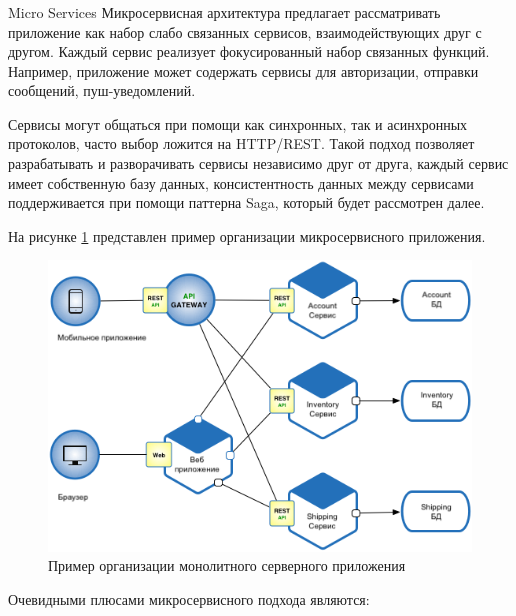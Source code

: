 \subsubsection {} Micro Services
Микросервисная архитектура предлагает рассматривать приложение как набор слабо связанных сервисов, взаимодействующих друг с другом. Каждый сервис реализует фокусированный набор связанных функций. Например, приложение может содержать сервисы для авторизации, отправки сообщений, пуш-уведомлений.

Сервисы могут общаться при помощи как синхронных, так и асинхронных протоколов, часто выбор ложится на HTTP/REST. Такой подход позволяет разрабатывать и разворачивать сервисы независимо друг от друга, каждый сервис имеет собственную базу данных, консистентность данных между сервисами поддерживается при помощи паттерна Saga, который будет рассмотрен далее. \cite{microservices:ms}

На рисунке \ref{sec:analysis:research:arch:back:micro} представлен пример организации микросервисного приложения.

\begin{figure}[h]
  \centering
    \includegraphics[width=1\textwidth]{inc/img/backend-micro.png}
  \caption{Пример организации монолитного серверного приложения}
  \label{sec:analysis:research:arch:back:micro}
\end{figure}

Очевидными плюсами микросервисного подхода являются:

